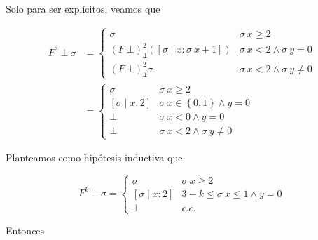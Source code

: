 \documentclass[article, 12pt]{article}
\begin{document}
Solo para ser explícitos, veamos que 

\begin{align*}
  F^3 ~ \bot  ~ \sigma 
  &= \begin{cases}
    \sigma & \sigma ~ x \geq 2 \\ 
    (F ~ \bot )^2_{\Bot} \left( [\sigma \mid x : \sigma ~ x + 1] \right)  & \sigma ~ x < 2
    \land \sigma ~ y = 0 \\
    (F ~ \bot )^2_{\Bot} \sigma  & \sigma ~ x < 2 \land \sigma ~ y \neq 0
  \end{cases} \\ 
  &= \begin{cases}
    \sigma & \sigma ~ x \geq 2 \\ 
    [\sigma \mid x : 2] & \sigma ~ x \in \left\{ 0, 1 \right\}  \land  y = 0 \\ 
    \bot  & \sigma ~ x < 0 \land  y = 0 \\ 
    \bot & \sigma ~ x <2 \land  \sigma ~  y \neq 0
  \end{cases}
\end{align*}

Planteamos como hipótesis inductiva que 

\begin{equation*}
  F^k ~ \bot ~ \sigma = \begin{cases}
    \sigma & \sigma ~ x \geq 2 \\ 
    [\sigma \mid x : 2] &3 - k \leq \sigma ~ x \leq 1 \land y = 0 \\ 
    \bot & c.c.
  \end{cases}
\end{equation*}

Entonces 
\end{document}
